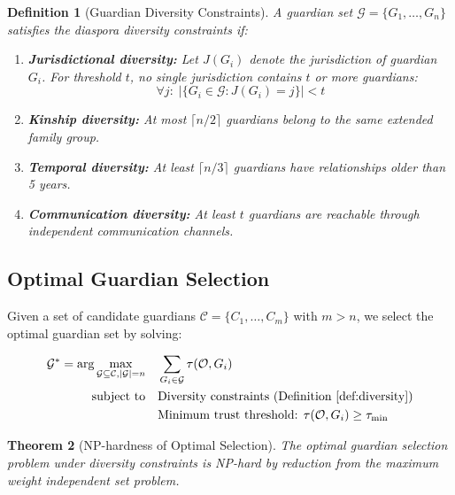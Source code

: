 \documentclass[11pt,a4paper,twocolumn]{article}
\newtheorem{theorem}{Theorem}[section]
\newtheorem{definition}[theorem]{Definition}
\begin{document}
\begin{definition}[Guardian Diversity Constraints]\label{def:diversity}
A guardian set $\mathcal{G} = \{G_1, \ldots, G_n\}$ satisfies the diaspora diversity constraints if:
\begin{enumerate}
  \item \textbf{Jurisdictional diversity:} Let $J(G_i)$ denote the jurisdiction of guardian $G_i$. For threshold $t$, no single jurisdiction contains $t$ or more guardians:
  \begin{equation}
    \forall j: \; |\{G_i \in \mathcal{G} : J(G_i) = j\}| < t
  \end{equation}
  \item \textbf{Kinship diversity:} At most $\lceil n/2 \rceil$ guardians belong to the same extended family group.
  \item \textbf{Temporal diversity:} At least $\lceil n/3 \rceil$ guardians have relationships older than 5 years.
  \item \textbf{Communication diversity:} At least $t$ guardians are reachable through independent communication channels.
\end{enumerate}
\end{definition}

\subsection{Optimal Guardian Selection}

Given a set of candidate guardians $\mathcal{C} = \{C_1, \ldots, C_m\}$ with $m > n$, we select the optimal guardian set by solving:

\begin{equation}\label{eq:optimization}
\begin{aligned}
  \mathcal{G}^* = \arg\max_{\mathcal{G} \subseteq \mathcal{C}, |\mathcal{G}| = n} \quad & \sum_{G_i \in \mathcal{G}} \tau(\mathcal{O}, G_i) \\
  \text{subject to} \quad & \text{Diversity constraints (Definition~\ref{def:diversity})} \\
  & \text{Minimum trust threshold: } \tau(\mathcal{O}, G_i) \geq \tau_{\min}
\end{aligned}
\end{equation}

\begin{theorem}[NP-hardness of Optimal Selection]\label{thm:nphard}
The optimal guardian selection problem under diversity constraints is NP-hard by reduction from the maximum weight independent set problem.
\end{theorem}
\end{document}
